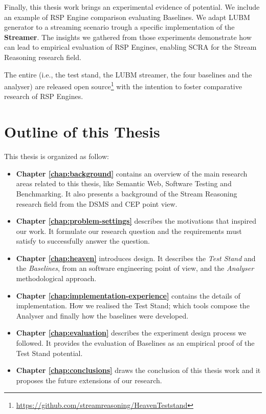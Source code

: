 Finally, this thesis work brings an experimental evidence of \name potential. We include an example of RSP Engine comparison evaluating \name Baselines. We adapt LUBM generator to a streaming scenario trough a specific implementation of the \textbf{Streamer}. The insights we gathered from those experiments demonstrate how \name can lead to empirical evaluation of RSP Engines, enabling SCRA for the Stream Reasoning research field.

The entire \name (i.e., the test stand, the LUBM streamer, the four baselines and the analyser) are released open source\footnote{\url{https://github.com/streamreasoning/HeavenTeststand}} with the intention to foster comparative research of RSP Engines.

\section{Outline of this Thesis}\label{sec:thesis-structure-intro}

This thesis is organized as follow:

\begin{itemize}

\item \textbf{Chapter \ref{chap:background}} contains an overview of the main research areas related to this thesis, like Semantic Web, Software Testing and Benchmarking. It also presents a background of the Stream Reasoning research field from the DSMS and CEP point view.
\item \textbf{Chapter \ref{chap:problem-settings}} describes the motivations that inspired our work. It formulate our research question and the requirements \name must satisfy to successfully answer the question.
\item \textbf{Chapter \ref{chap:heaven}} introduces \name design. It describes the \textit{Test Stand} and the \textit{Baselines}, from an software engineering point of view, and the \textit{Analyser} methodological approach.
\item \textbf{Chapter \ref{chap:implementation-experience}} contains the details of \name implementation. How we realised the Test Stand; which tools compose the Analyser and finally how the baselines were developed.
\item \textbf{Chapter \ref{chap:evaluation}} describes the experiment design process we followed. It provides the evaluation of \name Baselines as an empirical proof of the Test Stand potential.
\item \textbf{Chapter \ref{chap:conclusions}} draws the conclusion of this thesis work and it proposes the future extensions of our research.
\end{itemize}
